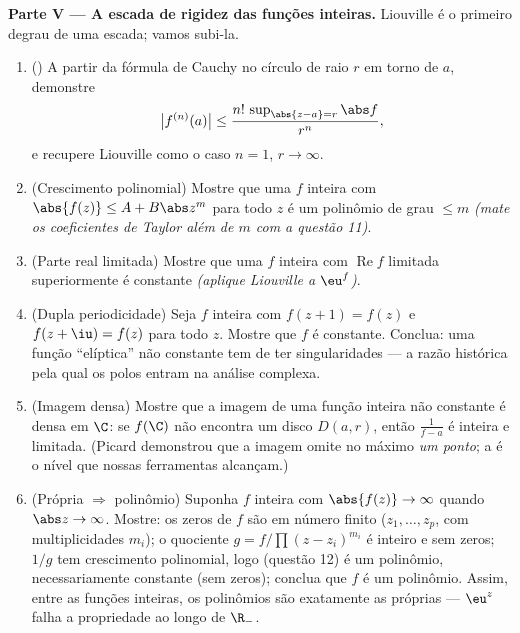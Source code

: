 \begin{problem}
\medskip
\noindent\textbf{Parte V --- A escada de rigidez das funções
inteiras.} Liouville é o primeiro degrau de uma escada; vamos subi-la.
\begin{enumerate}[resume]
  \item () A partir da fórmula de Cauchy no
        círculo de raio $r$ em torno de $a$, demonstre
        \[
        \bigl|f^{(n)}(a)\bigr| \leq
        \frac{n!\,\sup_{\abs{z-a}=r}\abs f}{r^n} ,
        \]
        e recupere Liouville como o caso $n = 1$, $r \to
        \infty$.
  \item (Crescimento polinomial) Mostre que uma $f$ inteira com
        $\abs{f(z)} \leq A + B\abs z^m$ para todo $z$ é um polinômio de grau $\leq m$
        \emph{(mate os coeficientes de Taylor além de $m$ com a
        questão 11)}.
  \item (Parte real limitada) Mostre que uma $f$ inteira com $\operatorname{Re}f$
        limitada superiormente é constante \emph{(aplique Liouville a
        $\eu^{f}$)}.
  \item (Dupla periodicidade) Seja $f$ inteira com $f(z + 1)
        = f(z)$ e $f(z + \iu) = f(z)$ para
        todo $z$. Mostre que $f$ é constante. Conclua: uma função
        ``elíptica'' não constante tem de ter singularidades --- a razão
        histórica pela qual os polos entram na análise complexa.
  \item (Imagem densa) Mostre que a imagem de uma função inteira não
        constante é densa em $\C$: se $f(\C)$ não encontra um
        disco $D(a, r)$, então $\frac1{f - a}$ é inteira e limitada. (Picard
        demonstrou que a imagem omite no máximo \emph{um ponto}; a
         é o nível que nossas ferramentas alcançam.)
  \item (Própria $\Rightarrow$ polinômio) Suponha $f$ inteira com $\abs{f(z)} \to \infty$
        quando $\abs z \to
        \infty$. Mostre: os zeros de $f$ são em número finito
        ($z_1, \dots, z_p$, com multiplicidades $m_i$); o quociente $g = f/\prod(z - z_i)^{m_i}$ é
        inteiro e sem zeros; $1/g$ tem crescimento polinomial, logo
        (questão 12) é um polinômio, necessariamente constante (sem
        zeros); conclua que $f$ é um polinômio. Assim, entre as
        funções inteiras, os polinômios são exatamente as próprias ---
        $\eu^z$ falha a propriedade ao longo de $\R_-$.
\end{enumerate}


\end{problem}
